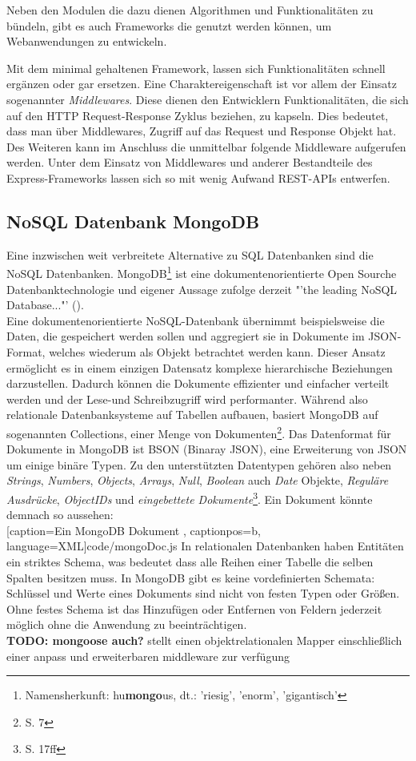 Neben den Modulen die dazu dienen Algorithmen und Funktionalitäten zu bündeln, gibt es auch Frameworks die genutzt werden können, um Webanwendungen zu entwickeln. 

Mit dem minimal gehaltenen Framework, lassen sich Funktionalitäten schnell ergänzen oder gar ersetzen. Eine Charaktereigenschaft ist vor allem der Einsatz sogenannter \textit{Middlewares}. Diese dienen den Entwicklern Funktionalitäten, die sich auf den HTTP Request-Response Zyklus beziehen, zu kapseln. Dies bedeutet, dass man über Middlewares, Zugriff auf das Request und Response Objekt hat. Des Weiteren kann im Anschluss die unmittelbar folgende Middleware aufgerufen werden. Unter dem Einsatz von Middlewares und anderer Bestandteile des Express-Frameworks lassen sich so mit wenig Aufwand \gls{REST}-\glspl{API} entwerfen.

\subsection{NoSQL Datenbank MongoDB}
Eine inzwischen weit verbreitete Alternative zu \gls{SQL} Datenbanken sind die \gls{NoSQL} Datenbanken. MongoDB\footnote{ Namensherkunft: hu\textbf{mongo}us, dt.: 'riesig', 'enorm', 'gigantisch'} ist eine dokumentenorientierte Open Sourche Datenbanktechnologie und eigener Aussage zufolge derzeit "'the leading NoSQL Database..."' (\cite{mongodb}). \\
Eine dokumentenorientierte \gls{NoSQL}-Datenbank übernimmt beispielsweise die Daten, die gespeichert werden sollen und aggregiert sie in Dokumente im \gls{JSON}-Format, welches wiederum als Objekt betrachtet werden kann. Dieser Ansatz ermöglicht es in einem einzigen Datensatz komplexe hierarchische Beziehungen darzustellen. Dadurch können die Dokumente effizienter und einfacher verteilt werden und der Lese-und Schreibzugriff wird performanter. Während also relationale Datenbanksysteme auf Tabellen aufbauen, basiert MongoDB auf sogenannten Collections, einer Menge von Dokumenten\footnote{ \cite{mongoDef} S. 7}. Das Datenformat für Dokumente in MongoDB ist BSON (Binaray JSON), eine Erweiterung von \gls{JSON} um einige binäre Typen. Zu den unterstützten Datentypen gehören also neben \textit{Strings}, \textit{Numbers}, \textit{Objects}, \textit{Arrays}, \textit{Null}, \textit{Boolean} auch \textit{Date} Objekte, \textit{Reguläre Ausdrücke}, \textit{ObjectIDs} und \textit{eingebettete Dokumente}\footnote{\cite{mongoDef} S. 17ff}. Ein Dokument könnte demnach so aussehen: \\

	[caption={Ein MongoDB Dokument}
	\label{code:mongo}, captionpos=b, language=XML]{code/mongoDoc.js}
In relationalen Datenbanken haben Entitäten ein striktes Schema, was bedeutet dass alle Reihen einer Tabelle die selben Spalten besitzen muss. In MongoDB gibt es keine vordefinierten Schemata: Schlüssel und Werte eines Dokuments sind nicht von festen Typen oder Größen. Ohne festes Schema ist das Hinzufügen oder Entfernen von Feldern jederzeit möglich ohne die Anwendung zu beeinträchtigen.\\
\textbf{\large TODO: mongoose auch?}
stellt einen objektrelationalen Mapper einschließlich einer anpass und erweiterbaren middleware zur verfügung
